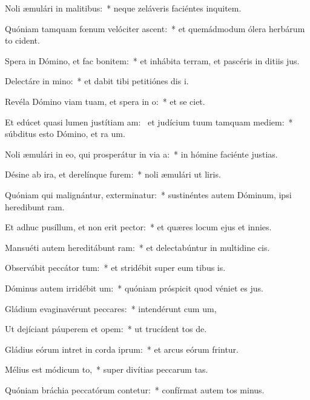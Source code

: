 \item Noli æmulári in malitibus:~* neque zeláveris faciéntes inquitem.
\item Quóniam tamquam fœnum velóciter ascent:~* et quemádmodum ólera herbárum to cident.
\item Spera in Dómino, et fac bonitem:~* et inhábita terram, et pascéris in ditiis jus.
\item Delectáre in mino:~* et dabit tibi petitiónes dis i.
\item Revéla Dómino viam tuam, et spera in o:~* et se ciet.
\item Et edúcet quasi lumen justítiam am:~\pscross{} et judícium tuum tamquam mediem:~* súbditus esto Dómino, et ra um.
\item Noli æmulári in eo, qui prosperátur in via a:~* in hómine faciénte justias.
\item Désine ab ira, et derelínque furem:~* noli æmulári ut liris.
\item Quóniam qui malignántur, exterminatur:~* sustinéntes autem Dóminum, ipsi heredibunt ram.
\item Et adhuc pusíllum, et non erit pector:~* et quæres locum ejus et  innies.
\item Mansuéti autem hereditábunt ram:~* et delectabúntur in multidine cis.
\item Observábit peccátor tum:~* et stridébit super eum tibus is.
\item Dóminus autem irridébit um:~* quóniam próspicit quod véniet es jus.
\item Gládium evaginavérunt peccares:~* intendérunt cum um,
\item Ut dejíciant páuperem et opem:~* ut trucídent tos de.
\item Gládius eórum intret in corda iprum:~* et arcus eórum frintur.
\item Mélius est módicum to,~* super divítias peccarum tas.
\item Quóniam bráchia peccatórum contetur:~* confírmat autem tos minus.

